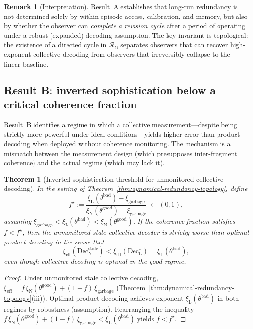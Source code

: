 \documentclass[11pt]{article}
\newcommand{\cR}{\mathcal{R}}
\newcommand{\1}{\mathbf{1}}
\newcommand{\QCBdist}{\xi}
\theoremstyle{definition}
\newtheorem{remark}{Remark}
\theoremstyle{plain}
\newtheorem{theorem}{Theorem}
\begin{document}
\begin{remark}[Interpretation]
Result~A establishes that long-run redundancy is not determined solely by within-episode access, calibration, and memory, but also by whether the observer can \emph{complete a revision cycle} after a period of operating under a robust (expanded) decoding assumption.
The key invariant is topological: the existence of a directed cycle in $\cR_O$ separates observers that can recover high-exponent collective decoding from observers that irreversibly collapse to the linear baseline.
\end{remark}

\subsection{Result B: inverted sophistication below a critical coherence fraction}

Result~B identifies a regime in which a collective measurement---despite being strictly more powerful under ideal conditions---yields higher error than product decoding when deployed without coherence monitoring.  The mechanism is a mismatch between the measurement design (which presupposes inter-fragment coherence) and the actual regime (which may lack it).

\begin{theorem}[Inverted sophistication threshold for unmonitored collective decoding]
\label{thm:inverted-sophistication}
In the setting of Theorem~\ref{thm:dynamical-redundancy-topology}, define
\[
f^\star
:=
\frac{\QCBdist_{\mathrm{L}}(\theta^{\mathrm{bad}})-\QCBdist_{\mathrm{garbage}}}{\QCBdist_{\mathrm{N}}(\theta^{\mathrm{good}})-\QCBdist_{\mathrm{garbage}}}
\;\in\;(0,1),
\]
assuming $\QCBdist_{\mathrm{garbage}}<\QCBdist_{\mathrm{L}}(\theta^{\mathrm{bad}})<\QCBdist_{\mathrm{N}}(\theta^{\mathrm{good}})$.
If the coherence fraction satisfies $f<f^\star$, then the unmonitored stale collective decoder is strictly worse than optimal product decoding in the sense that
\[
\QCBdist_{\mathrm{eff}}(\mathrm{Dec}_{\mathrm{N}}^{\mathrm{stale}})
<
\QCBdist_{\mathrm{eff}}(\mathrm{Dec}_{\mathrm{L}}^{\star})
=
\QCBdist_{\mathrm{L}}(\theta^{\mathrm{bad}}),
\]
even though collective decoding is optimal in the good regime.
\end{theorem}

\begin{proof}
Under unmonitored stale collective decoding,
$\QCBdist_{\mathrm{eff}}=f\,\QCBdist_{\mathrm{N}}(\theta^{\mathrm{good}})+(1-f)\,\QCBdist_{\mathrm{garbage}}$ (Theorem~\ref{thm:dynamical-redundancy-topology}(iii)).
Optimal product decoding achieves exponent $\QCBdist_{\mathrm{L}}(\theta^{\mathrm{bad}})$ in both regimes by robustness (assumption).
Rearranging the inequality
$f\,\QCBdist_{\mathrm{N}}(\theta^{\mathrm{good}})+(1-f)\,\QCBdist_{\mathrm{garbage}} < \QCBdist_{\mathrm{L}}(\theta^{\mathrm{bad}})$
yields $f<f^\star$.
\end{proof}
\end{document}
